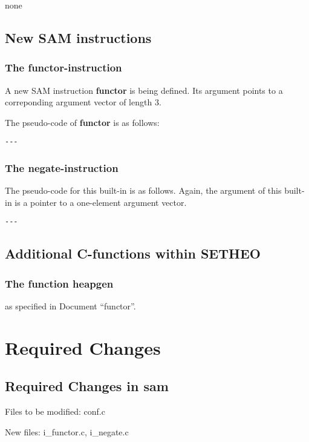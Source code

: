none

\subsection{New SAM instructions}

\subsubsection{The functor-instruction}

A new SAM instruction {\bf functor} is being defined. Its argument
points to a correponding argument vector of length 3.

The pseudo-code of {\bf functor} is as follows:

\begin{verbatim}
---
\end{verbatim}

\subsubsection{The negate-instruction}

The pseudo-code for this built-in is as follows. Again, the argument
of this built-in is a pointer to a one-element argument vector.

\begin{verbatim}
---
\end{verbatim}

\subsection{Additional C-functions within SETHEO}
\subsubsection{The function heapgen}

as specified in Document ``functor''.

\section{Required Changes}

\subsection{Required Changes in sam}

Files to be modified: conf.c

New files: i\_functor.c, i\_negate.c

